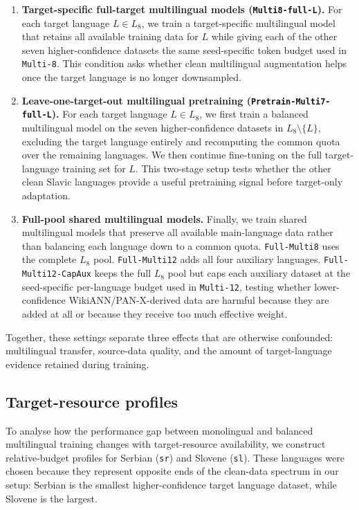 \documentclass{article}
\begin{document}
\begin{enumerate}[leftmargin=*, itemsep=-2pt, topsep=-3pt]
    \item \textbf{Target-specific full-target multilingual models (\texttt{Multi8-full-L}).}
    For each target language $L \in L_8$, we train a target-specific multilingual model that retains all available training data for $L$ while giving each of the other seven higher-confidence datasets the same seed-specific token budget used in \texttt{Multi-8}.
    This condition asks whether clean multilingual augmentation helps once the target language is no longer downsampled.

    \item \textbf{Leave-one-target-out multilingual pretraining (\texttt{Pretrain-Multi7-full-L}).}
    For each target language $L \in L_8$, we first train a balanced multilingual model on the seven higher-confidence datasets in $L_8 \setminus \{L\}$, excluding the target language entirely and recomputing the common quota over the remaining languages.
    We then continue fine-tuning on the full target-language training set for $L$.
    This two-stage setup tests whether the other clean Slavic languages provide a useful pretraining signal before target-only adaptation.

    \item \textbf{Full-pool shared multilingual models.}
    Finally, we train shared multilingual models that preserve all available main-language data rather than balancing each language down to a common quota. \texttt{Full-Multi8} uses the complete $L_8$ pool.
    \texttt{Full-Multi12} adds all four auxiliary languages.
    \texttt{Full-Multi12-CapAux} keeps the full $L_8$ pool but caps each auxiliary dataset at the seed-specific per-language budget used in \texttt{Multi-12}, testing whether lower-confidence WikiANN/PAN-X-derived data are harmful because they are added at all or because they receive too much effective weight.
\end{enumerate}

Together, these settings separate three effects that are otherwise confounded: multilingual transfer, source-data quality, and the amount of target-language evidence retained during training.

\subsection{Target-resource profiles}
To analyse how the performance gap between monolingual and balanced multilingual training changes with target-resource availability, we construct relative-budget profiles for Serbian (\texttt{sr}) and Slovene (\texttt{sl}).
These languages were chosen because they represent opposite ends of the clean-data spectrum in our setup: Serbian is the smallest higher-confidence target language dataset, while Slovene is the largest.
\end{document}
